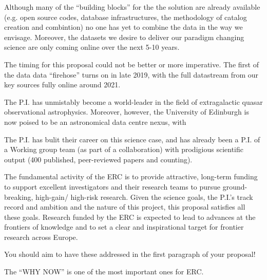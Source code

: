 \documentclass[oneside, a4paper, onecolumn, 11pt]{article}
\begin{document}
Although many of the ``building blocks'' for the the solution are already available
(e.g. open source codes, database infrastructures, the methodology of catalog creation and combintion) 
no one has yet to combine the data in the way we envisage. Moreover, the datasets we desire
to deliver our paradigm changing science are only coming online over the next 5-10 years.

\smallskip
\smallskip
\noindent
The timing for this proposal could not be better or more imperative. 
The first of the data data ``firehose'' turns on in late 2019, with
the full datastream from our key sources fully online around 2021. 


\smallskip
\smallskip
\noindent
The P.I. has unmistably become a world-leader in the field of 
extragalactic quasar observational astrophysics. 
Moreover, however, the University of Edinburgh is now poised to be an 
astronomical data centre nexus, with 

The P.I. has bulit their career on this science case, and has already been a P.I. 
of a Working group team (as part of a collaboration) with prodigious scientific
output (400 published, peer-reviewed papers and counting). 


\smallskip
\smallskip
\noindent
The fundamental activity of the ERC is to provide attractive,
long-term funding to support excellent investigators and their
research teams to pursue ground-breaking, high-gain/ high-risk
research.
Given the science goals, the P.I.'s track record and ambition and 
the nature of this project, this proposal satisfies all these goals.
Research funded by the ERC is expected to lead to advances at the
frontiers of knowledge and to set a clear and inspirational target for
frontier research across Europe.

You should aim to have these addressed in the first paragraph of your proposal! 

The “WHY NOW” is one of the most important ones for ERC.

\end{document}
